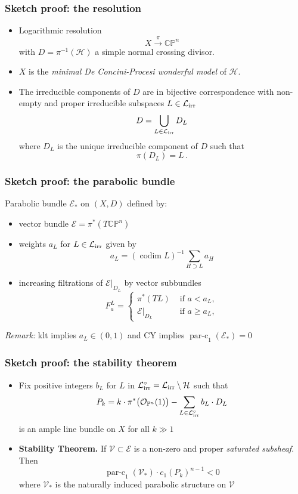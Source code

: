 \documentclass{beamer}
\renewcommand{\P}{\mathbb{P}}
\newcommand{\CP}{\mathbb{CP}}
\newcommand{\mE}{\mathcal{E}}
\newcommand{\mO}{\mathcal{O}}
\newcommand{\mH}{\mathcal{H}}
\newcommand{\mV}{\mathcal{V}}
\newcommand{\mLi}{\mathcal{L}_{\textup{irr}}}
\DeclareMathOperator{\codim}{codim}
\DeclareMathOperator{\parc}{par-c}
\begin{document}
\begin{frame}
	\frametitle{Sketch proof: the resolution}
	\begin{itemize}
		\item Logarithmic resolution
		\[
		X \xrightarrow{\pi} \CP^n
		\]
		with \(D = \pi^{-1}(\mH)\) a simple normal crossing divisor.
		
		\item \(X\) is the \emph{minimal De Concini-Procesi wonderful model} of \(\mH\). 
		
		\item The irreducible components of \(D\) are in bijective correspondence with non-empty and proper irreducible subspaces \(L \in \mLi\) 
		\[
		D = \bigcup_{L \in \mLi} D_L
		\]
		where \(D_L\) is the unique irreducible component of \(D\) such that 
		\[
		\pi(D_L) = L \,.
		\]
		
	\end{itemize}
\end{frame}


\begin{frame}
	\frametitle{Sketch proof: the parabolic bundle}
	Parabolic bundle \(\mE_{*}\) on \((X,D)\) defined by:
	\begin{itemize}
		\item vector bundle \(\mE = \pi^*(T\CP^n)\)
		\item weights \(a_L\) for \(L \in \mLi\) given by
		\[
		a_L = (\codim L)^{-1} \sum_{H \supset L} a_H 
		\]
		\item increasing filtrations of \(\mE|_{D_L}\) by vector subbundles 
		\begin{equation*}
		F^L_a = 
		\begin{cases}
		\pi^*(TL) &\text{ if } a < a_L, \\
		\mE|_{D_L} &\text{ if } a \geq a_L ,
		\end{cases}
		\end{equation*}	
	\end{itemize}
\emph{Remark:} klt implies \(a_L \in (0,1)\) and 
CY implies \(\parc_1(\mE_{*}) = 0\)
\end{frame}


\begin{frame}
	\frametitle{Sketch proof: the stability theorem}
	\begin{itemize}
		\item Fix positive integers \(b_L\) for \(L\) in \( \mLi^{\circ} = \mLi \setminus \mH\) such  that
		\begin{equation*}
		P_k = k \cdot \pi^*\big(\mO_{\P^n}(1)\big) - \sum_{L \in \mLi^{\circ}} b_L \cdot D_L
		\end{equation*}
		is an ample line bundle on \(X\) for all \(k \gg 1\)
		
		\item \textbf{Stability Theorem.}
		If \(\mV \subset \mE\) is a non-zero and proper \emph{saturated subsheaf}. Then
		\[
		\parc_{1}(\mV_{*}) \cdot c_1(P_k)^{n-1} < 0 
		\]
		where \(\mV_{*}\) is the naturally induced parabolic structure on \(\mV\)
	\end{itemize}
\end{frame}
\end{document}

